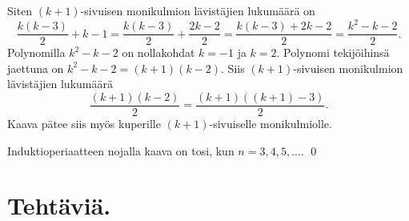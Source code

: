 
Siten $(k + 1)$-sivuisen monikulmion lävistäjien lukumäärä on
\[
\frac{k (k - 3)}{2} +k-1=
\frac{k (k - 3)}{2} + \frac{2k - 2}{2}
=
\frac{k (k - 3)+2k-2}{2}=\frac{k^2-k-2}{2}.
\]
Polynomilla $k^2 - k - 2$ on nollakohdat $k = -1$ ja $k = 2$. Polynomi tekijöihinsä jaettuna
on $k^2 -k -2 = (k + 1)(k- 2)$. Siis $(k + 1)$-sivuisen monikulmion lävistäjien lukumäärä
\[
\frac{(k + 1)(k - 2)}{2}= \frac{(k + 1)((k + 1)-3)}{2}.
\]
Kaava pätee siis myös kuperille $(k + 1)$-sivuiselle monikulmiolle.

Induktioperiaatteen nojalla kaava on tosi, kun $n=3,4,5,\ldots$.
\qed

\newpage



\section*{Tehtäviä.}

